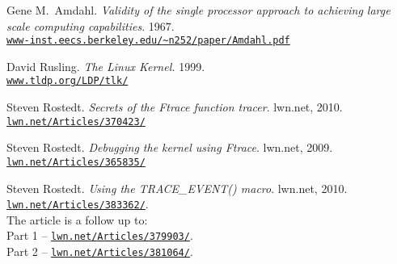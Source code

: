 \documentclass[10pt, oneside]{book}
\begin{document}
\begin{thebibliography}{}
Gene M.\ Amdahl.
\textit{Validity of the single processor approach to achieving large scale
computing capabilities}.
1967.\\
\href{http://www-inst.eecs.berkeley.edu/\textasciitilde n252/paper/Amdahl.pdf}{\texttt{www-inst.eecs.berkeley.edu/\textasciitilde n252/paper/Amdahl.pdf}}

David Rusling.
\textit{The Linux Kernel.}
1999.\\
\href{https://www.tldp.org/LDP/tlk/}{\texttt{www.tldp.org/LDP/tlk/}}

Steven Rostedt.
\textit{Secrets of the Ftrace function tracer}.
lwn.net, 2010.
\href{https://lwn.net/Articles/370423/}{\texttt{lwn.net/Articles/370423/}}

Steven Rostedt.
\textit{Debugging the kernel using Ftrace}.
lwn.net, 2009.
\href{https://lwn.net/Articles/365835/}{\texttt{lwn.net/Articles/365835/}}

Steven Rostedt.
\textit{Using the TRACE\_EVENT() macro}.
lwn.net, 2010.
\href{https://lwn.net/Articles/383362/}{\texttt{lwn.net/Articles/383362/}}.\\
The article is a follow up to:\\
Part 1 -- \href{https://lwn.net/Articles/379903/}{\texttt{lwn.net/Articles/379903/}}.\\
Part 2 -- \href{https://lwn.net/Articles/381064/}{\texttt{lwn.net/Articles/381064/}}.
\end{thebibliography}
\end{document}
